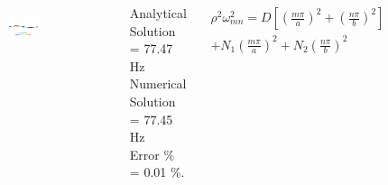 \documentclass[9pt]{beamer}
\begin{document}
\begin{frame}
\begin{columns}
\begin{figure}[h!]
\begin{subfigure}{1\textwidth}
\end{subfigure}\vfill
\begin{subfigure}{1\textwidth}
\includegraphics[width=\linewidth,trim={0 8cm 0 8cm},clip]{NAS277_pos_3.png}
\end{subfigure}

\end{figure}

Analytical Solution = 77.47 Hz \\
Numerical Solution =  77.45 Hz \\
Error $\%$ = 0.01 $\%$.


\begin{equation*}
\begin{split}
\rho^2 \omega_{mn}^2=   D  \left[ \left( \frac{m\pi}{a} \right)^2 + \left( \frac{n\pi}{b} \right)^2 \right]\\ + N_1 \left( \frac{m\pi}{a} \right)^2 +N_2 \left( \frac{n\pi}{b} \right)^2 
\end{split}
\end{equation*}






\end{columns}
\end{frame}
\end{document}
